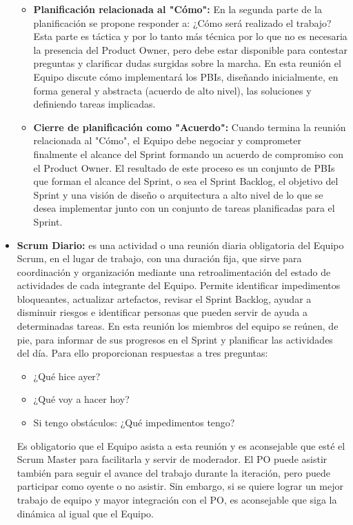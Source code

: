 \begin{itemize}
\begin{itemize}
\item \textbf{Planificación relacionada al "Cómo":} En la segunda parte de la planificación se propone responder a: ¿Cómo será realizado el trabajo? Esta parte es táctica y por lo tanto más técnica por lo que no es necesaria la presencia del Product Owner, pero debe estar disponible para contestar preguntas y clarificar dudas surgidas sobre la marcha. En esta reunión el Equipo discute cómo implementará los PBIs, diseñando inicialmente, en forma general y abstracta (acuerdo de alto nivel), las soluciones y definiendo tareas implicadas. 

\item \textbf{Cierre de planificación como "Acuerdo":} Cuando termina la reunión relacionada al "Cómo", el Equipo debe negociar y comprometer finalmente el alcance del Sprint formando un acuerdo de compromiso con el Product Owner. El resultado de este proceso es un conjunto de PBIs que forman el alcance del Sprint, o sea el Sprint Backlog, el objetivo del Sprint y una visión de diseño o arquitectura a alto nivel de lo que se desea implementar junto con un conjunto de tareas planificadas para el Sprint.

\end{itemize}

\item \textbf{Scrum Diario:} es una actividad o una reunión diaria obligatoria del Equipo Scrum, en el lugar de trabajo, con una duración fija, que sirve para coordinación y organización mediante una retroalimentación del estado de actividades de cada integrante del Equipo. Permite identificar impedimentos bloqueantes, actualizar artefactos, revisar el Sprint Backlog, ayudar a disminuir riesgos e identificar personas que pueden servir de ayuda a determinadas tareas. En esta reunión los miembros del equipo se reúnen, de pie, para informar de sus progresos en el Sprint y planificar las actividades del día. Para ello proporcionan respuestas a tres preguntas:

\begin{itemize}
\item{¿Qué hice ayer?}
\item{¿Qué voy a hacer hoy?}
\item{Si tengo obstáculos: ¿Qué impedimentos tengo?}
\end{itemize}

Es obligatorio que el Equipo asista a esta reunión y es aconsejable que esté el Scrum Master para facilitarla y servir de moderador. El PO puede asistir también para seguir el avance del trabajo durante la iteración, pero puede participar como oyente o no asistir. Sin embargo, si se quiere lograr un mejor trabajo de equipo y mayor integración con el PO, es aconsejable que siga la dinámica al igual que el Equipo.


\end{itemize}
